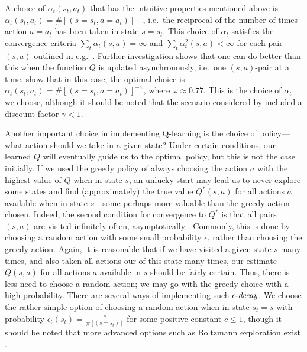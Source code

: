 A choice of $\alpha_t(s_t,a_t)$ that has the intuitive properties mentioned above is $\alpha_t(s_t,a_t) = \#[(s=s_t,a=a_t)]^{-1}$,
i.e.\ the reciprocal of the number of times action $a = a_t$ has been taken in state $s=s_t$. This choice of $\alpha_t$ satisfies
the convergence criteria $\sum_t \alpha_t(s,a) = \infty$ and $\sum_t \alpha^2_t(s,a) < \infty$ for each pair $(s, a)$ outlined in e.g.\ 
\citet{Watkins1992}. Further investigation shows that one can do better than this when the function $Q$ is updated 
asynchronously, i.e.\ one $(s,a)$-pair at a time. \citet{EvenDar2003} show that in this case, the optimal choice is 
$\alpha_t(s_t,a_t) = \#[(s=s_t,a=a_t)]^{-\omega}$, where $\omega \approx 0.77$. This is the choice of $\alpha_t$ we choose,
although it should be noted that the scenario considered by \citet{EvenDar2003} included a discount factor $\gamma < 1$.

Another important choice in implementing Q-learning is the choice of policy---what action should we take in a given state? 
Under certain conditions, our learned $Q$ will eventually guide us to the optimal policy, but this is not the case initially.
If we used the greedy policy of always choosing the action $a$ with the highest value of $Q$ when in state $s$, an unlucky
start may lead us to never explore some states and find (approximately) the true value $Q^*(s,a)$ for all actions $a$ 
available when in state $s$---some perhaps more valuable than the greedy action chosen. Indeed, the second condition for 
convergence to $Q^*$ is that all pairs $(s, a)$ are visited infinitely often, asymptotically \citep{RLDP}.
Commonly, this is done by choosing a random action with some small probability $\epsilon$, rather than choosing the greedy action.
Again, it is reasonable that if we have visited a given state $s$ many times, and also taken all actions our of this state
many times, our estimate $Q(s,a)$ for all actions $a$ available in $s$ should be fairly certain. Thus, there is less need to
choose a random action; we may go with the greedy choice with a high probability. There are several ways of implementing such
$\epsilon\text{-\emph{decay}}$. We choose the rather simple option of choosing a random action when in state $s_t=s$ with probability 
$\epsilon_t(s_t) = \frac{c}{\#[(s=s_t)]}$ for some positive constant $c \leq 1$, though it should be noted that more advanced options 
such as Boltzmann exploration exist \citep{RLDP}.

